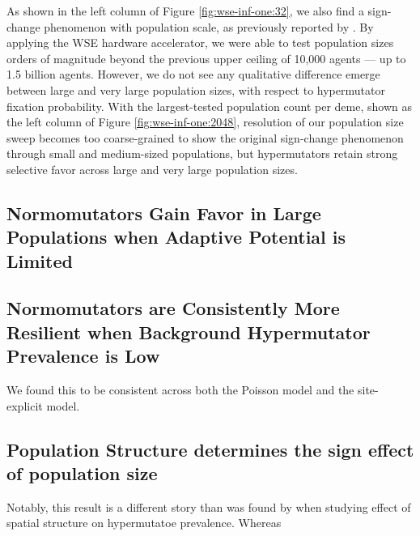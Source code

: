 As shown in the left column of Figure \ref{fig:wse-inf-one:32}, we also find a sign-change phenomenon with population scale, as previously reported by \citet{raynes2018sign}.
By applying the WSE hardware accelerator, we were able to test population sizes orders of magnitude beyond the previous upper ceiling of 10,000 agents --- up to 1.5 billion agents.
However, we do not see any qualitative difference emerge between large and very large population sizes, with respect to hypermutator fixation probability.
With the largest-tested population count per deme, shown as the left column of Figure \ref{fig:wse-inf-one:2048}, resolution of our population size sweep becomes too coarse-grained to show the original sign-change phenomenon through small and medium-sized populations, but hypermutators retain strong selective favor across large and very large population sizes.

\subsection{Normomutators Gain Favor in Large Populations when Adaptive Potential is Limited}



\subsection{Normomutators are Consistently More Resilient when Background Hypermutator Prevalence is Low}



We found this to be consistent across both the Poisson model and the site-explicit model.

\subsection{Population Structure determines the sign effect of population size}



Notably, this result is a different story than was found by \citet{raynes2019migration} when studying effect of spatial structure on hypermutatoe prevalence.
Whereas
